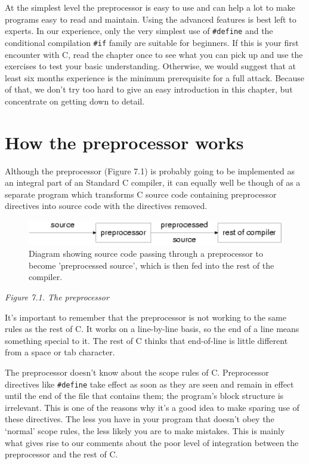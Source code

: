   At the simplest level the preprocessor is easy to use and can help
   a lot to make programs easy to read and maintain. Using the advanced
   features is best left to experts. In our experience, only the very
   simplest use of \texttt{\#define} and the conditional compilation
   \texttt{\#if} family are suitable for beginners. If this is your first
   encounter with C, read the chapter once to see what you can pick up and
   use the exercises to test your basic understanding. Otherwise, we would
   suggest that at least six months experience is the minimum prerequisite
   for a full attack. Because of that, we don't try too hard to give an easy
   introduction in this chapter, but concentrate on getting down to
   detail.


 
        \section{How the preprocessor works}
        

  

  Although the preprocessor (Figure 7.1) is probably going
   to be implemented as an integral part of an Standard C compiler, it can
   equally well be though of as a separate program which transforms C source
   code containing preprocessor directives into source code with the
   directives removed.


  \begin{figure}\centering\includegraphics[type=pdf,read=.pdf,ext=.pdf,scale=1.0]{figure/7.1}\caption{Diagram showing source code passing through a preprocessor to become           'preprocessed source', which is then fed into the rest of the           compiler.}\end{figure}

\begin{center}\textit{Figure 7.1. The preprocessor}\end{center}


  It's important to remember that the preprocessor is not working to the
   same rules as the rest of C. It works on a line-by-line basis, so the end
   of a line means something special to it. The rest of C thinks that
   end-of-line is little different from a space or tab character.


  The preprocessor doesn't know about the scope rules of C. Preprocessor
   directives like \texttt{\#define} take effect as soon as they are seen
   and remain in effect until the end of the file that contains them; the
   program's block structure is irrelevant. This is one of the reasons why
   it's a good idea to make sparing use of these directives. The less you
   have in your program that doesn't obey the `normal' scope rules,
   the less likely you are to make mistakes. This is mainly what gives rise
   to our comments about the poor level of integration between the
   preprocessor and the rest of C.


